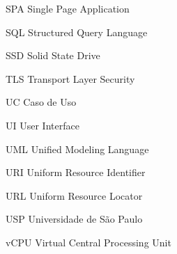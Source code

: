 \begin{siglas}
  \item[SPA] Single Page Application
  \item[SQL] Structured Query Language
  \item[SSD] Solid State Drive
  \item[TLS] Transport Layer Security
  \item[UC] Caso de Uso
  \item[UI] User Interface
  \item[UML] Unified Modeling Language
  \item[URI] Uniform Resource Identifier
  \item[URL] Uniform Resource Locator
  \item[USP] Universidade de São Paulo
  \item[vCPU] Virtual Central Processing Unit
\end{siglas}
